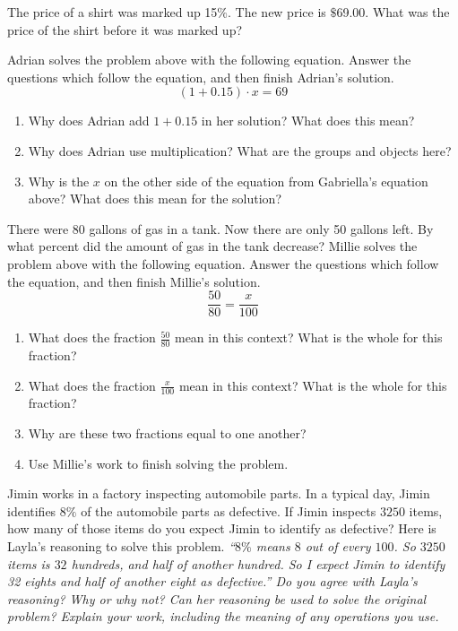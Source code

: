 \documentclass[noauthor,nooutcomes, handout]{ximera}
\begin{document}
\begin{problem}
The price of a shirt was marked up 15$\%$.  The new price is $\$$69.00.  What was the price of the shirt before it was marked up?

\vskip 0.1in

Adrian solves the problem above with the following equation. Answer the questions which follow the equation, and then finish Adrian's solution.
\[
(1+0.15)\cdot x = 69
\]
\begin{enumerate}
	\item Why does Adrian add $1+0.15$ in her solution? What does this mean?
	\item Why does Adrian use multiplication? What are the groups and objects here?
	\item Why is the $x$ on the other side of the equation from Gabriella's equation above? What does this mean for the solution?
\end{enumerate}

\end{problem}



\begin{problem}
There were 80 gallons of gas in a tank.  Now there are only 50 gallons left.  By what percent did the amount of gas in the tank decrease?  
\vskip 0.1in
Millie solves the problem above with the following equation. Answer the questions which follow the equation, and then finish Millie's solution.
\[
\frac{50}{80} = \frac{x}{100}
\]
\begin{enumerate}
	\item What does the fraction $\frac{50}{80}$ mean in this context? What is the whole for this fraction?
	\item What does the fraction $\frac{x}{100}$ mean in this context? What is the whole for this fraction?
	\item Why are these two fractions equal to one another?
	\item Use Millie's work to finish solving the problem.
\end{enumerate}


\end{problem}



\begin{problem}
Jimin works in a factory inspecting automobile parts. In a typical day, Jimin identifies $8\%$ of the automobile parts as defective. If Jimin inspects $3250$ items, how many of those items do you expect Jimin to identify as defective?
\vskip 0.1in
Here is Layla's reasoning to solve this problem. \em{``$8\%$ means $8$ out of every $100$. So $3250$ items is $32$ hundreds, and half of another hundred. So I expect Jimin to identify 32 eights and half of another eight as defective.''}
\vskip 0.1in
Do you agree with Layla's reasoning? Why or why not? Can her reasoning be used to solve the original problem? Explain your work, including the meaning of any operations you use.

\end{problem}
\end{document}
